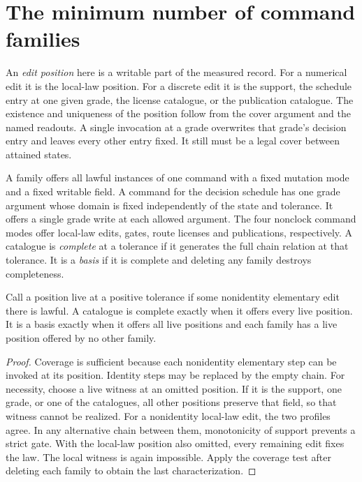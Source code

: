 \section{The minimum number of command families}\label{sec:basis}

An \emph{edit position} here is a writable part of the measured
record. For a numerical edit it is the local-law position.
For a discrete edit it is the support, the schedule entry at one
given grade, the license catalogue, or the publication catalogue.
The existence and uniqueness of the position follow from the cover
argument and the named readouts. A single invocation at a grade
overwrites that grade's decision entry and leaves every other
entry fixed. It still must be a legal cover between attained states.

\begin{definition}
A family offers all lawful instances of one command with a fixed
mutation mode and a fixed writable field. A command for the
decision schedule has one grade argument whose domain is fixed
independently of the state and tolerance. It offers a single grade
write at each allowed argument. The four nonclock command modes
offer local-law edits, gates, route licenses and publications,
respectively. A catalogue is \emph{complete} at a tolerance if it
generates the full chain relation at that tolerance. It is a
\emph{basis} if it is complete and deleting any family destroys
completeness.
\end{definition}

\begin{lemma}\label{lem:live}
Call a position live at a positive tolerance if some nonidentity
elementary edit there is lawful. A catalogue is complete exactly
when it offers every live position. It is a basis exactly when
it offers all live positions and each family has a live position
offered by no other family.
\end{lemma}
\begin{proof}
Coverage is sufficient because each nonidentity elementary step
can be invoked at its position. Identity steps may be replaced
by the empty chain. For necessity, choose a live witness at an
omitted position. If it is the support, one grade, or one of the
catalogues, all other positions preserve that field, so that witness
cannot be realized. For a nonidentity local-law edit, the two
profiles agree. In any alternative chain between them, monotonicity
of support prevents a strict gate. With the local-law position
also omitted, every remaining edit fixes the law. The local
witness is again impossible. Apply the coverage test after deleting
each family to obtain the last characterization.
\end{proof}

